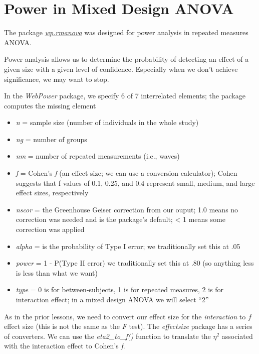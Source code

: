 \documentclass[
  11pt,
]{book}
\providecommand{\tightlist}{%
  \setlength{\itemsep}{0pt}\setlength{\parskip}{0pt}}
\begin{document}
\hypertarget{power-in-mixed-design-anova}{%
\section{Power in Mixed Design ANOVA}\label{power-in-mixed-design-anova}}

The package \href{https://webpower.psychstat.org/wiki/_media/grant/practical_statistica_interior_for_kindle.pdf}{\emph{wp.rmanova}} was designed for power analysis in repeated measures ANOVA.

Power analysis allows us to determine the probability of detecting an effect of a given size with a given level of confidence. Especially when we don't achieve significance, we may want to stop.

In the \emph{WebPower} package, we specify 6 of 7 interrelated elements; the package computes the missing element

\begin{itemize}
\tightlist
\item
  \emph{n} = sample size (number of individuals in the whole study)
\item
  \emph{ng} = number of groups
\item
  \emph{nm} = number of repeated measurements (i.e., waves)
\item
  \emph{f} = Cohen's \emph{f} (an effect size; we can use a conversion calculator); Cohen suggests that f values of 0.1, 0.25, and 0.4 represent small, medium, and large effect sizes, respectively
\item
  \emph{nscor} = the Greenhouse Geiser correction from our ouput; 1.0 means no correction was needed and is the package's default; \textless{} 1 means some correction was applied
\item
  \emph{alpha} = is the probability of Type I error; we traditionally set this at .05
\item
  \emph{power} = 1 - P(Type II error) we traditionally set this at .80 (so anything less is less than what we want)
\item
  \emph{type} = 0 is for between-subjects, 1 is for repeated measures, 2 is for interaction effect; in a mixed design ANOVA we will select ``2''
\end{itemize}

As in the prior lessons, we need to convert our effect size for the \emph{interaction} to \(f\) effect size (this is not the same as the \emph{F} test). The \emph{effectsize} package has a series of converters. We can use the \emph{eta2\_to\_f()} function to translate the \(\eta^{2}\) associated with the interaction effect to Cohen's \emph{f}.
\end{document}
